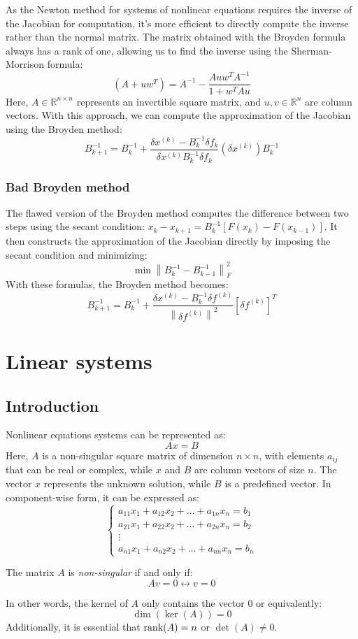 \documentclass[12pt, a4paper]{report}
\begin{document}
    As the Newton method for systems of nonlinear equations requires the inverse of the Jacobian for computation, it's more efficient to directly compute the inverse rather than the normal matrix. 
    The matrix obtained with the Broyden formula always has a rank of one, allowing us to find the inverse using the Sherman-Morrison formula:
    \[\left(A+uw^{T}\right)=A^{-1}-\dfrac{Auw^TA^{-1}}{1+w^TAu}\]
    Here, $A \in \mathbb{R}^{n \times n}$ represents an invertible square matrix, and $u,v \in \mathbb{R}^{n}$ are column vectors. 
    With this approach, we can compute the approximation of the Jacobian using the Broyden method:
    \[B_{k+1}^{-1}=B_{k}^{-1}+\dfrac{\delta x^{(k)}-B_k^{-1}\delta f_k}{\delta x^{(k)}B_k^{-1}\delta f_k}\left(\delta x^{(k)}\right)B_k^{-1}\]

    \subsection{Bad Broyden method}
    The flawed version of the Broyden method computes the difference between two steps using the secant condition: $x_k-x_{k+1}=B_k^{-1}\left[ F(x_k)-F(x_{k-1}) \right]$. 
    It then constructs the approximation of the Jacobian directly by imposing the secant condition and minimizing:
    \[\min{\left\lVert B_k^{-1}-B_{k-1}^{-1} \right\rVert_{F}^{2}}\]
    With these formulas, the Broyden method becomes:
    \[B_{k+1}^{-1}=B_{k}^{-1}+\dfrac{\delta x^{(k)}-B_k^{-1}\delta f^{(k)}}{{\left\lVert\delta f^{(k)} \right\rVert}^2}\left[ \delta f^{(k)} \right]^T\]


\newpage

\chapter{Linear systems}
    \section{Introduction}
    Nonlinear equations systems can be represented as:
    \[Ax=B\]
    Here, $A$ is a non-singular square matrix of dimension $n \times n$, with elements $a_{ij}$ that can be real or complex, while $x$ and $B$ are column vectors of size $n$.
    The vector $x$ represents the unknown solution, while $B$ is a predefined vector. 
    In component-wise form, it can be expressed as:
    \[
    \begin{cases}
        a_{11}x_1+a_{12}x_2+\dots+a_{1n}x_n=b_1 \\
        a_{21}x_1+a_{22}x_2+\dots+a_{2n}x_n=b_2 \\
        \vdots                                  \\
        a_{n1}x_1+a_{n2}x_2+\dots+a_{nn}x_n=b_n
    \end{cases}
    \]
    \begin{definition}
        The matrix $A$ is \emph{non-singular} if and only if: 
        \[Av=0\leftrightarrow v=0\]
    \end{definition}
    In other words, the kernel of $A$ only contains the vector $0$ or equivalently: 
    \[\dim{\left(\ker{\left(A\right)}\right)}=0\]
    Additionally, it is essential that $\textnormal{rank}(A)=n$ or $\det(A)\neq 0$. 
\end{document}
